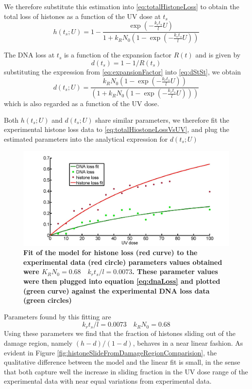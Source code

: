 \documentclass[12pt]{paper}
\begin{document}
We therefore substitute this estimation into \ref{eq:totalHistoneLoss} to obtain the total loss of histones as a function of the UV dose at $t_{s}$
\begin{equation}\label{eq:totalHiostoneLossVsUV}
h(t_s;U)=1-\frac{\exp(-\frac{k_rt_s}{l}U)}{ 1+k_RN_0(1-\exp(-\frac{k_rt_s}{l}U))}
\end{equation}
 
The DNA loss at $t_{s}$ is a function of the expansion factor $R(t)$ and is given by 
\begin{equation}\label{eq:dStSt}
d(t_s)= 1-1/R(t_s) 
\end{equation}
substituting the expression from \ref{eq:expansionFactor} into \ref{eq:dStSt}, we obtain 
\begin{equation}\label{eq:dnaLoss}
d(t_s;U) =  \frac{k_RN_0(1-\exp(-\frac{k_rt_s}{l}U))}{(1+k_RN_0(1-\exp(-\frac{k_rt_s}{l}U)))}
\end{equation}
which is also regarded as a function of the UV dose. 

Both $h(t_s;U)$ and $d(t_s;U)$ share similar parameters, we therefore fit the experimental histone loss data to \ref{eq:totalHiostoneLossVsUV}, and plug the estimated parameters into the analytical expression for $d(t_s;U) $
\begin{figure}[H]
\centering
\includegraphics[width=0.5\linewidth, height=0.3\textheight]{images/histoneAndDnaVsUvDoseModelFit}
\caption{\textbf{\tiny{}Fit of the model for histone loss (red curve) to the experimental data (red circle) parameters values obtained were $K_RN_0 =0.68\quad k_rt_s/l=0.0073$. These parameter values were then plugged into equation \ref{eq:dnaLoss} and plotted (green curve) against the experimental DNA loss data (green circles)}}
\label{fig:histoneAndDnaVsUvDoseModelFit}
\end{figure}

Parameters found by this fitting are 
\begin{equation}
k_rt_s/l = 0.0073 \quad k_RN_0 = 0.68
\end{equation}
Using these parameters we find that the fraction of histones sliding out of the damage region, namely $(h-d)/(1-d)$, behaves in a near linear fashion. As evident 
in Figure \ref{fig:histoneSlideFromDamageRegionComparision}, the qualitative difference between the model and the linear fit is small, in the sense that  both capture well the increase in sliding fraction in the UV dose range of the experimental data with near equal variations from experimental data. 
\end{document}
